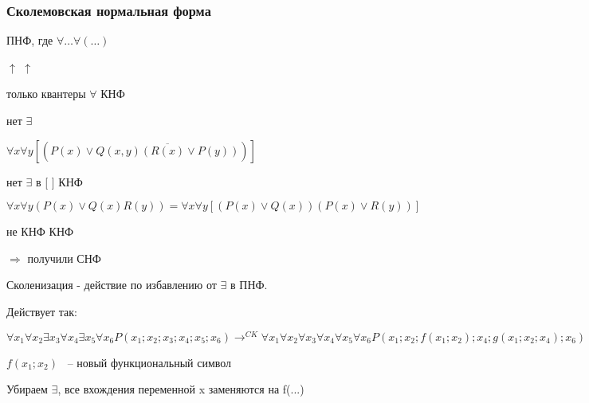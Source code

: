 \documentclass[russian]{lecture-notes}
\begin{document}
    \subsubsection{Сколемовская нормальная форма}

    \begin{definition}
        ПНФ, где $\forall \dots \forall (\dots)$

        \qquad \qquad \qquad \qquad \qquad \quad $\uparrow$ \qquad \quad $\uparrow$

        \qquad \quad  только квантеры $\forall$ \qquad КНФ

        \qquad \qquad \qquad нет $\exists$


        \end{definition}

    \begin{example}

        $\forall x \forall y [ (P(x) \lor \overline{Q(x,y)(R(x) \lor P(y))})]$

        нет $\exists$ в [ ] КНФ

        \end{example}

    \begin{example}

        $\forall x \forall y (P(x) \lor Q(x)R(y)) = \forall x \forall y [(P(x) \lor Q(x))(P(x) \lor R(y))]$

        \qquad \qquad \qquad \qquad не КНФ \qquad \qquad \qquad \qquad \qquad \qquad КНФ

        $\Rightarrow $ получили СНФ


        \end{example}

    \begin{definition}

        Сколенизация - действие по избавлению от $\exists$ в ПНФ.

        \end{definition}

    Действует так:

    $\forall x_{1} \forall x_{2} \exists x_{3} \forall x_{4} \exists x_{5} \forall x_{6} P(x_{1};x_{2};
    x_{3};x_{4};x_{5};x_{6}) \rightarrow^{CK} \forall x_{1} \forall x_{2} \forall x_{3} \forall x_{4} \forall x_{5}
    \forall x_{6} P(x_{1};x_{2};f(x_{1};x_{2});x_{4};g(x_{1};x_{2};x_{4});x_{6})$

    $f(x_{1};x_{2})$ ~-- новый функциональный символ


    Убираем $\exists$, все вхождения переменной x заменяются на f(...)
\end{document}
